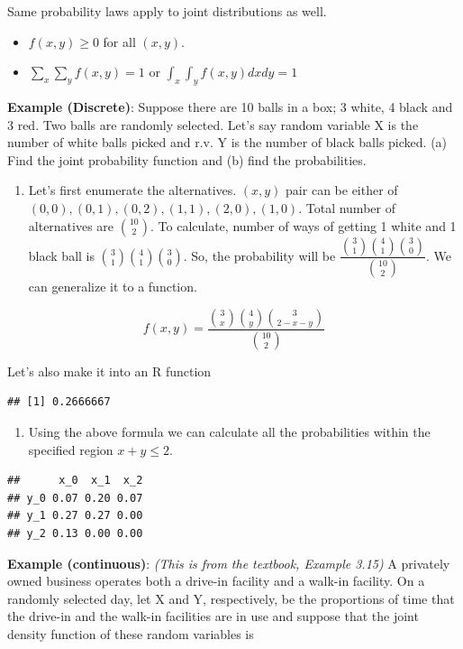 \documentclass[]{book}
\providecommand{\tightlist}{%
  \setlength{\itemsep}{0pt}\setlength{\parskip}{0pt}}
\theoremstyle{definition}
\theoremstyle{definition}
\theoremstyle{definition}
\theoremstyle{remark}
\begin{document}
Same probability laws apply to joint distributions as well.

\begin{itemize}
\tightlist
\item
  \(f(x,y) \ge 0\) for all \((x,y)\).
\item
  \(\sum_x \sum_y f(x,y) = 1\) or \(\int_x \int_y f(x,y) dx dy = 1\)
\end{itemize}

\textbf{Example (Discrete)}: Suppose there are 10 balls in a box; 3
white, 4 black and 3 red. Two balls are randomly selected. Let's say
random variable X is the number of white balls picked and r.v. Y is the
number of black balls picked. (a) Find the joint probability function
and (b) find the probabilities.

\begin{enumerate}
\def\labelenumi{(\alph{enumi})}
\tightlist
\item
  Let's first enumerate the alternatives. \((x,y)\) pair can be either
  of \((0,0),(0,1),(0,2),(1,1),(2,0),(1,0)\). Total number of
  alternatives are \(\binom{10}{2}\). To calculate, number of ways of
  getting 1 white and 1 black ball is
  \(\binom{3}{1}\binom{4}{1}\binom{3}{0}\). So, the probability will be
  \(\dfrac{\binom{3}{1}\binom{4}{1}\binom{3}{0}}{\binom{10}{2}}\). We
  can generalize it to a function.
\end{enumerate}

\[f(x,y) = \dfrac{\binom{3}{x}\binom{4}{y}\binom{3}{2-x-y}}{\binom{10}{2}}\]

Let's also make it into an R function

\begin{verbatim}
## [1] 0.2666667
\end{verbatim}

\begin{enumerate}
\def\labelenumi{(\alph{enumi})}
\setcounter{enumi}{1}
\tightlist
\item
  Using the above formula we can calculate all the probabilities within
  the specified region \(x+y \le 2\).
\end{enumerate}

\begin{verbatim}
##      x_0  x_1  x_2
## y_0 0.07 0.20 0.07
## y_1 0.27 0.27 0.00
## y_2 0.13 0.00 0.00
\end{verbatim}

\textbf{Example (continuous)}: \emph{(This is from the textbook, Example
3.15)} A privately owned business operates both a drive-in facility and
a walk-in facility. On a randomly selected day, let X and Y,
respectively, be the proportions of time that the drive-in and the
walk-in facilities are in use and suppose that the joint density
function of these random variables is
\end{document}
